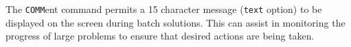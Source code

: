 \headb

The {\tt COMM}ent command permits a 15 character message ({\tt text} option)
to be displayed on the screen during batch solutions.
This can assist in monitoring the progress of large problems to ensure
that desired actions are being taken.  
\vfill\eject
